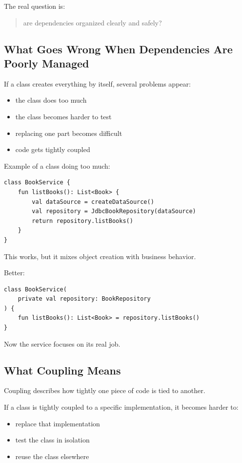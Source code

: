 \documentclass[11pt,a4paper]{article}
\begin{document}
The real question is:
\begin{quote}
are dependencies organized clearly and safely?
\end{quote}

\subsection{What Goes Wrong When Dependencies Are Poorly Managed}

If a class creates everything by itself, several problems appear:
\begin{itemize}
    \item the class does too much
    \item the class becomes harder to test
    \item replacing one part becomes difficult
    \item code gets tightly coupled
\end{itemize}

Example of a class doing too much:

\begin{lstlisting}[style=kazekotlin]
class BookService {
    fun listBooks(): List<Book> {
        val dataSource = createDataSource()
        val repository = JdbcBookRepository(dataSource)
        return repository.listBooks()
    }
}
\end{lstlisting}

This works, but it mixes object creation with business behavior.

Better:

\begin{lstlisting}[style=kazekotlin]
class BookService(
    private val repository: BookRepository
) {
    fun listBooks(): List<Book> = repository.listBooks()
}
\end{lstlisting}

Now the service focuses on its real job.

\subsection{What Coupling Means}

Coupling describes how tightly one piece of code is tied to another.

If a class is tightly coupled to a specific implementation, it becomes harder to:
\begin{itemize}
    \item replace that implementation
    \item test the class in isolation
    \item reuse the class elsewhere
\end{itemize}
\end{document}
